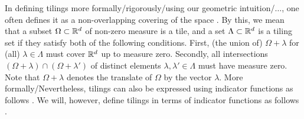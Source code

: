 \documentclass[../thesis.tex]{subfiles}
\begin{document}



In defining tilings more formally/rigorously/using our geometric intuition/$\dots$, one often defines it as a non-overlapping covering of the space \cite{iosevichSpectralTilingProperties1998}. By this, we mean that a subset $\Omega \subset \mathbb{R}^d$ of non-zero measure is a tile, and a set $\Lambda \subset \mathbb{R}^d$ is a tiling set if they satisfy both of the following conditions. First, (the union of) $\Omega+\lambda$ for (all) $\lambda \in \Lambda$ must cover $\mathbb{R}^d$ up to measure zero. Secondly, all intersections $(\Omega+\lambda) \cap (\Omega+\lambda')$ of distinct elements $\lambda,\lambda' \in \Lambda$ must have measure zero. Note that $\Omega+\lambda$ denotes the translate of $\Omega$ by the vector $\lambda$. More formally/Nevertheless, tilings can also be expressed using indicator functions as follows \cite{kolountzakisTilingsTranslation2010}. \SigridChange{/} We will, however, define tilings in terms of indicator functions as follows \cite{kolountzakisTilingsTranslation2010}.
\end{document}
